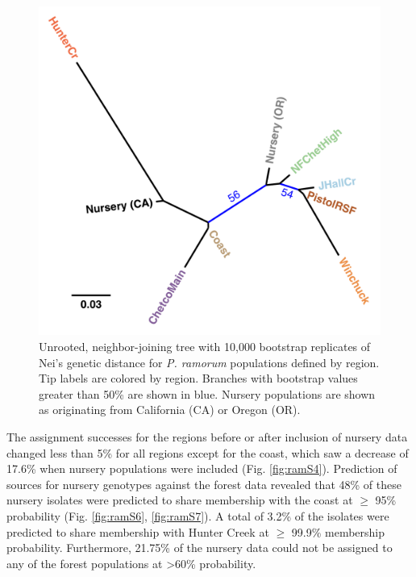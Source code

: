\documentclass[double,12pt]{beavtex}
\begin{document}
  \begin{figure}
  
  {\centering \includegraphics[width=0.8\linewidth]{figure/phytopathology/figure_5} 
  
  }
  
  \caption[Unrooted, neighbor-joining tree with 10,000 bootstrap replicates of
  Nei's genetic distance for \emph{P. ramorum} populations defined by
  region.]{Unrooted, neighbor-joining tree with 10,000 bootstrap replicates of
  Nei's genetic distance for \emph{P. ramorum} populations defined by
  region. Tip labels are colored by region. Branches with bootstrap values
  greater than 50\% are shown in blue. Nursery populations are shown as
  originating from California (CA) or Oregon (OR).}\label{fig:ramorum5}
  \end{figure}
  
  \newpage
  
  The assignment successes for the regions before or after inclusion of
  nursery data changed less than 5\% for all regions except for the coast,
  which saw a decrease of 17.6\% when nursery populations were included
  (Fig. \ref{fig:ramS4}). Prediction of sources for nursery genotypes
  against the forest data revealed that 48\% of these nursery isolates
  were predicted to share membership with the coast at \(\geq\) 95\%
  probability (Fig. \ref{fig:ramS6}, \ref{fig:ramS7}). A total of 3.2\% of
  the isolates were predicted to share membership with Hunter Creek at
  \(\geq\) 99.9\% membership probability. Furthermore, 21.75\% of the
  nursery data could not be assigned to any of the forest populations at
  \textgreater{}60\% probability.
  
\end{document}
